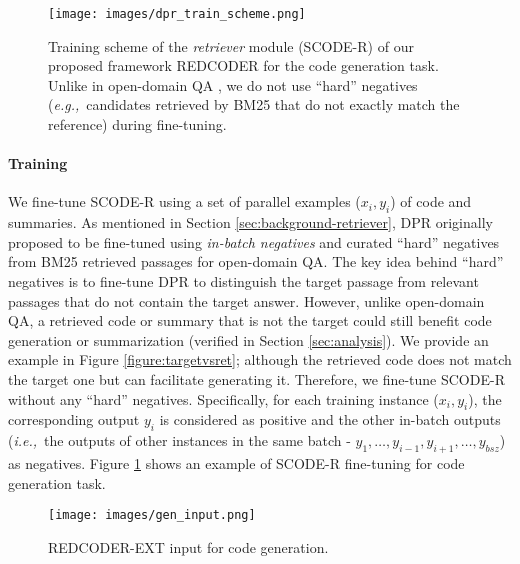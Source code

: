 \documentclass[11pt]{article}
\newcommand{\toolext}{{REDCODER-EXT}\xspace}
\newcommand{\coder}{SCODE-R\xspace}
\newcommand{\eg}{\textit{e.g.,}~}
\newcommand{\ie}{\textit{i.e.,}~}
\begin{document}
\begin{figure}[!t]
\captionsetup[subfigure]{labelformat=empty}
\centering
\texttt{[image: images/dpr\_train\_scheme.png]}
\caption{
Training scheme of the {\em retriever} module (\coder) of our proposed framework REDCODER  for the code generation task. Unlike in open-domain QA \cite{karpukhin-etal-2020-dense}, we do not use ``hard'' negatives (\eg candidates retrieved by BM25 that do not exactly match the reference) during fine-tuning.
}
\vspace{-2mm}
\label{figure:dpr_train}
\end{figure}



\paragraph{Training}


We fine-tune \coder using a set of parallel examples ($x_i, y_i$) of code and summaries.
As mentioned in Section \ref{sec:background-retriever}, DPR originally proposed to be fine-tuned using \emph{in-batch negatives} and curated ``hard'' negatives from BM25 retrieved passages for open-domain QA. 
The key idea behind ``hard'' negatives is to fine-tune DPR to distinguish the target passage from relevant passages that do not contain the target answer.
However, unlike open-domain QA, a retrieved code or summary that is not the target could still benefit code generation or summarization (verified in Section \ref{sec:analysis}).
We provide an example in Figure \ref{figure:targetvsret}; although the retrieved code does not match the target one but can facilitate generating it.
Therefore, we fine-tune \coder without any ``hard'' negatives. 
Specifically, for each training instance ($x_i, y_i$), the corresponding output $y_i$ is considered as positive and the other in-batch outputs (\ie the outputs of other instances in the same batch - $y_1, \ldots, y_{i-1}, y_{i+1}, \ldots, y_{bsz}$) as negatives.
Figure \ref{figure:dpr_train} shows an example of \coder fine-tuning for code generation task. 



\begin{figure}[t]
\captionsetup[subfigure]{labelformat=empty}
\centering
\hspace*{-3pt}
\texttt{[image: images/gen\_input.png]}
\caption{\toolext input for code generation. }
\vspace{-2mm}
\label{figure:gen_input}
\end{figure}
\end{document}
